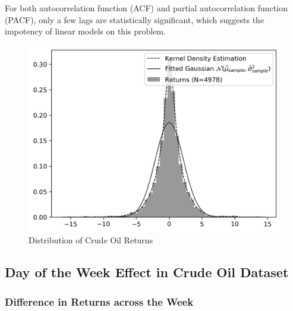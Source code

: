 \documentclass[12pt]{article}
\begin{document}
	\par For both autocorrelation function (ACF) and partial autocorrelation function (PACF), only a few lags are statistically significant, which suggests the impotency  of linear models on this problem.
	\begin{figure}[H]
		\centering
		\small
		\caption{Distribution of Crude Oil Returns}
		\includegraphics{figures/wti_summary/return_hist.png}
	\end{figure}
 
	\subsection{Day of the Week Effect in Crude Oil Dataset}
	\subsubsection{Difference in Returns across the Week}
\end{document}
